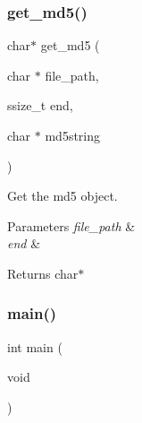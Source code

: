 \mbox{\label{prueba_8c_a3f712a1f36520724d253cae12dfb7fda}} 
\subsubsection{get\+\_\+md5()}
{\footnotesize\ttfamily char$\ast$ get\+\_\+md5 (\begin{DoxyParamCaption}\item[{char $\ast$}]{file\+\_\+path,  }\item[{ssize\+\_\+t}]{end,  }\item[{char $\ast$}]{md5string }\end{DoxyParamCaption})}



Get the md5 object. 


\begin{DoxyParams}{Parameters}
{\em file\+\_\+path} & \\
\hline
{\em end} & \\
\hline
\end{DoxyParams}
\begin{DoxyReturn}{Returns}
char$\ast$ 
\end{DoxyReturn}
\mbox{\label{prueba_8c_ae66f6b31b5ad750f1fe042a706a4e3d4}} 
\subsubsection{main()}
{\footnotesize\ttfamily int main (\begin{DoxyParamCaption}\item[{void}]{ }\end{DoxyParamCaption})}

